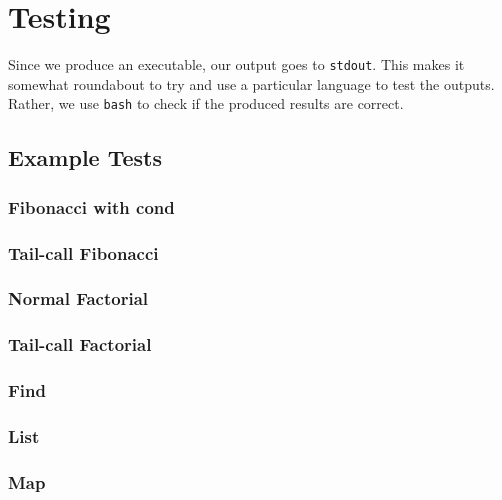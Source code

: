 \chapter{Testing}\label{ch:tests}

Since we produce an executable, our output goes to \texttt{stdout}. This makes it somewhat roundabout to
try and use a particular language to test the outputs. Rather, we use \texttt{bash} to check if the produced
results are correct.

\section{Example Tests}
\subsection*{Fibonacci with cond}


\subsection*{Tail-call Fibonacci}


\subsection*{Normal Factorial}


\subsection*{Tail-call Factorial}


\subsection*{Find}


\subsection*{List}


\subsection*{Map}


